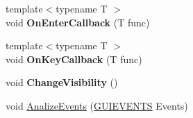 \begin{DoxyCompactItemize}
\item 
{\footnotesize template$<$typename T $>$ }\\void {\bfseries On\+Enter\+Callback} (T func)\hypertarget{class_widget_aedf910304b53826c13499ae5c7d216ab}{}\label{class_widget_aedf910304b53826c13499ae5c7d216ab}

\item 
{\footnotesize template$<$typename T $>$ }\\void {\bfseries On\+Key\+Callback} (T func)\hypertarget{class_widget_a8fde430fc9da59f1bd0e845e2ff3dd8a}{}\label{class_widget_a8fde430fc9da59f1bd0e845e2ff3dd8a}

\item 
void {\bfseries Change\+Visibility} ()\hypertarget{class_widget_a3eaa397caf4cc540d05fb6483cd22531}{}\label{class_widget_a3eaa397caf4cc540d05fb6483cd22531}

\item 
void \hyperlink{class_widget_a1742a55bdb8d76ec569d1692978b6426}{Analize\+Events} (\hyperlink{struct_g_u_i_e_v_e_n_t_s}{G\+U\+I\+E\+V\+E\+N\+TS} Events)
\end{DoxyCompactItemize}
